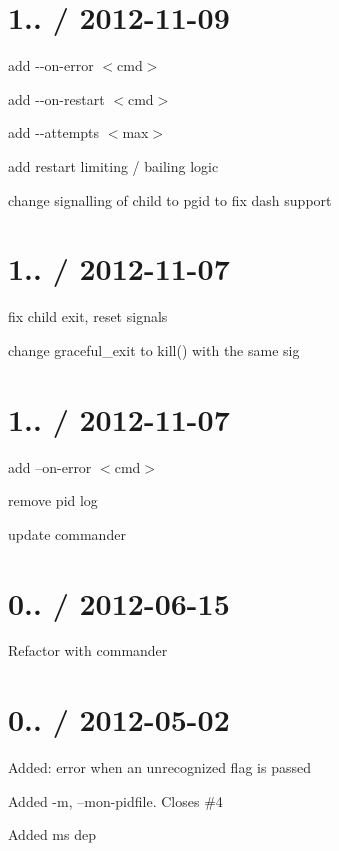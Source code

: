 \section*{1.. / 2012-\/11-\/09 }


\begin{DoxyItemize}
\item add {\ttfamily -\/-\/on-\/error $<$cmd$>$}
\item add {\ttfamily -\/-\/on-\/restart $<$cmd$>$}
\item add {\ttfamily -\/-\/attempts $<$max$>$}
\item add restart limiting / bailing logic
\item change signalling of child to pgid to fix {\ttfamily dash} support
\end{DoxyItemize}

\section*{1.. / 2012-\/11-\/07 }


\begin{DoxyItemize}
\item fix child exit, reset signals
\item change graceful\+\_\+exit to kill() with the same sig
\end{DoxyItemize}

\section*{1.. / 2012-\/11-\/07 }


\begin{DoxyItemize}
\item add --on-\/error $<$cmd$>$
\item remove pid log
\item update commander
\end{DoxyItemize}

\section*{0.. / 2012-\/06-\/15 }


\begin{DoxyItemize}
\item Refactor with commander
\end{DoxyItemize}

\section*{0.. / 2012-\/05-\/02 }


\begin{DoxyItemize}
\item Added\+: error when an unrecognized flag is passed
\item Added -\/m, --mon-\/pidfile. Closes \#4
\item Added ms dep 
\end{DoxyItemize}